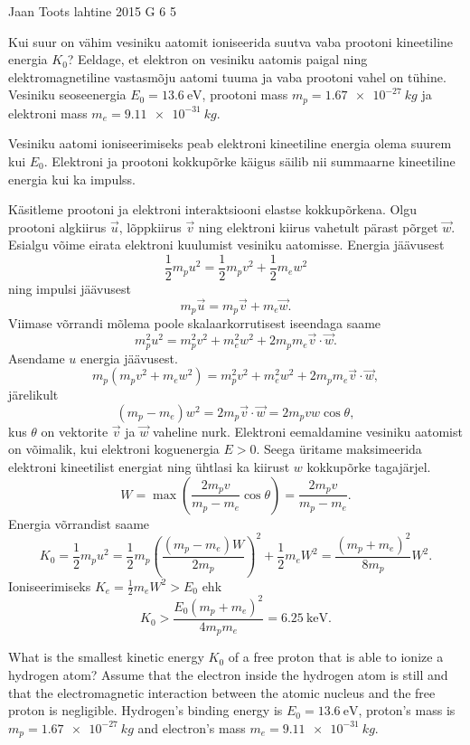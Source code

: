 {Jaan Toots} %
{lahtine} %
{2015} %
{G 6} %
{5} %
{
\ifStatement
Kui suur on vähim vesiniku aatomit ioniseerida suutva vaba prootoni kineetiline energia $K_0$? Eeldage, et elektron on vesiniku aatomis paigal ning elektromagnetiline vastasmõju aatomi tuuma ja vaba prootoni vahel on tühine. Vesiniku seoseenergia $E_0 = \SI{13.6}{\electronvolt}$, prootoni mass $m_p=\SI{1.67e-27}{kg}$ ja elektroni mass $m_e=\SI{9.11e-31}{kg}$.
\fi


\ifHint
Vesiniku aatomi ioniseerimiseks peab elektroni kineetiline energia olema suurem kui $E_0$. Elektroni ja prootoni kokkupõrke käigus säilib nii summaarne kineetiline energia kui ka impulss.
\fi


\ifSolution
Käsitleme prootoni ja elektroni interaktsiooni elastse kokkupõrkena. Olgu prootoni algkiirus $\vec{u}$, lõppkiirus $\vec{v}$ ning elektroni kiirus vahetult pärast põrget $\vec{w}$. Esialgu võime eirata elektroni kuulumist vesiniku aatomisse. Energia jäävusest
\[
\frac{1}{2}m_p u^2 = \frac{1}{2}m_p v^2 + \frac{1}{2}m_e w^2
\]
ning impulsi jäävusest
\[
m_p \vec{u} = m_p \vec{v} + m_e \vec{w}.
\]
Viimase võrrandi mõlema poole skalaarkorrutisest iseendaga saame
\[
m_p^2 u^2 = m_p^2 v^2 + m_e^2 w^2 + 2 m_p m_e \vec{v}\cdot \vec{w}.
\]
Asendame $u$ energia jäävusest.
\[
m_p ( m_p v^2 + m_e w^2 ) = m_p^2 v^2 + m_e^2 w^2 + 2 m_p m_e \vec{v}\cdot \vec{w},
\]
järelikult
\[
( m_p - m_e ) w^2 = 2 m_p \vec{v}\cdot\vec{w} = 2 m_p vw \cos\theta,
\]
kus $\theta$ on vektorite $\vec{v}$ ja $\vec{w}$ vaheline nurk. Elektroni eemaldamine vesiniku aatomist on võimalik, kui elektroni koguenergia $E>0$. Seega üritame maksimeerida elektroni kineetilist energiat ning ühtlasi ka kiirust $w$ kokkupõrke tagajärjel.
\[
W = \max\left(\frac{2 m_p v}{m_p - m_e}\cos\theta\right) = \frac{2 m_p v}{m_p - m_e}.
\]
Energia võrrandist saame
\[
K_0 = \frac{1}{2}m_p u^2 = \frac{1}{2}m_p \left(\frac{( m_p - m_e ) W}{2 m_p}\right)^2 + \frac{1}{2}m_e W^2 = \frac{(m_p + m_e)^2}{8 m_p} W^2.
\]
Ioniseerimiseks $K_e = \frac{1}{2}m_e W^2 > E_0$ ehk
\[
K_0 > \frac{E_0 (m_p + m_e)^2}{4 m_p m_e} = \SI{6.25}{\kilo\electronvolt}.
\]
\fi


\ifEngStatement
What is the smallest kinetic energy $K_0$ of a free proton that is able to ionize a hydrogen atom? Assume that the electron inside the hydrogen atom is still and that the electromagnetic interaction between the atomic nucleus and the free proton is negligible. Hydrogen’s binding energy is $E_0 = \SI{13.6}{\electronvolt}$, proton’s mass is $m_p=\SI{1.67e-27}{kg}$ and electron’s mass $m_e=\SI{9.11e-31}{kg}$.
\fi


}
